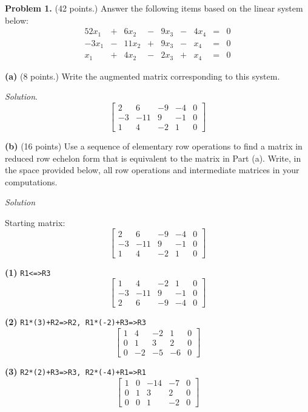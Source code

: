 \documentclass[12pt]{article}
\begin{document}
\textbf{Problem 1.} (42 points.) Answer the following items based on the linear system below:
\begin{alignat*}{5}
 2x_1 & {}+{} &  6x_2  & {}-{} & 9x_3  & {}-{} & 4x_4 & {}={} &  0 \\
-3x_1 & {}-{} &  11x_2 & {}+{} & 9x_3  & {}-{} &  x_4 & {}={} &  0 \\
  x_1 & {}+{} &   4x_2 & {}-{} & 2x_3  & {}+{} &  x_4 & {}={} &  0
\end{alignat*}

\textbf{(a)} (8 points.) Write the augmented matrix corresponding to this system.

\emph{Solution}.
\[
\left[\begin{matrix}2 & 6 & -9 & -4 & 0\\-3 & -11 & 9 & -1 & 0\\1 & 4 & -2 & 1 & 0\end{matrix}\right]
\]

\bigskip
\textbf{(b)} (16 points) Use a sequence of elementary row operations to find a matrix in reduced row echelon form that is equivalent to the matrix in Part (a). Write, in the space provided below, all row operations and intermediate matrices in your computations.

\emph{Solution}

Starting matrix:
\[
\left[\begin{matrix}2 & 6 & -9 & -4 & 0\\-3 & -11 & 9 & -1 & 0\\1 & 4 & -2 & 1 & 0\end{matrix}\right]
\]

\textbf{(1)} \texttt{R1<=>R3}
\[\left[\begin{matrix}1 & 4 & -2 & 1 & 0\\-3 & -11 & 9 & -1 & 0\\2 & 6 & -9 & -4 & 0\end{matrix}\right]\]

\textbf{(2)} \texttt{R1*(3)+R2=>R2, R1*(-2)+R3=>R3}
\[\left[\begin{matrix}1 & 4 & -2 & 1 & 0\\0 & 1 & 3 & 2 & 0\\0 & -2 & -5 & -6 & 0\end{matrix}\right]\]

\textbf{(3)} \texttt{R2*(2)+R3=>R3, R2*(-4)+R1=>R1}
\[\left[\begin{matrix}1 & 0 & -14 & -7 & 0\\0 & 1 & 3 & 2 & 0\\0 & 0 & 1 & -2 & 0\end{matrix}\right]\]
\end{document}
